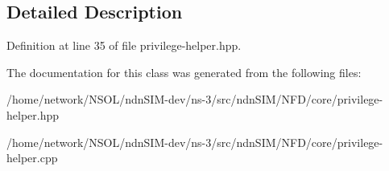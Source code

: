 \subsection{Detailed Description}


Definition at line 35 of file privilege-\/helper.\+hpp.



The documentation for this class was generated from the following files\+:\begin{DoxyCompactItemize}
\item 
/home/network/\+N\+S\+O\+L/ndn\+S\+I\+M-\/dev/ns-\/3/src/ndn\+S\+I\+M/\+N\+F\+D/core/privilege-\/helper.\+hpp\item 
/home/network/\+N\+S\+O\+L/ndn\+S\+I\+M-\/dev/ns-\/3/src/ndn\+S\+I\+M/\+N\+F\+D/core/privilege-\/helper.\+cpp\end{DoxyCompactItemize}
